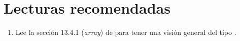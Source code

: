 \section{Lecturas recomendadas}

\begin{enumerate}

\item Lee la sección 13.4.1 (\emph{array})
      de \tourbook{}
      para tener una visión general del tipo .

\end{enumerate}
